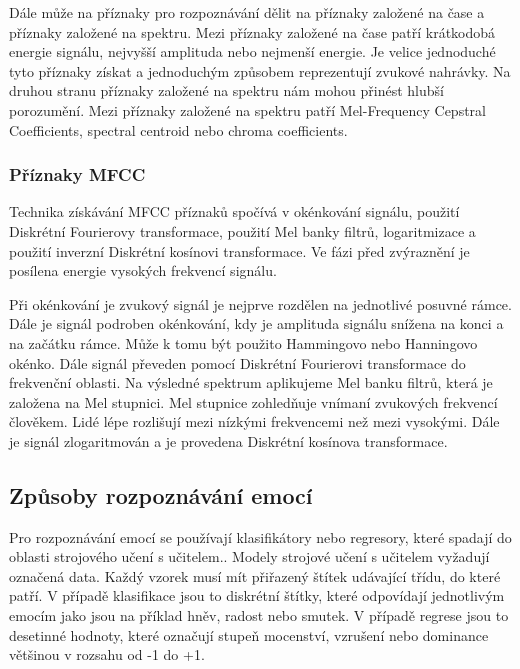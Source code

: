 \documentclass[FM,BP]{tulthesis}
\begin{document}
Dále může na příznaky pro rozpoznávání dělit na příznaky založené na čase a příznaky založené na spektru. Mezi příznaky založené na čase patří krátkodobá energie signálu, nejvyšší amplituda nebo nejmenší energie. Je velice jednoduché tyto příznaky získat a jednoduchým způsobem reprezentují zvukové nahrávky. Na druhou stranu příznaky založené na spektru nám mohou přinést hlubší porozumění. Mezi příznaky založené na spektru patří Mel-Frequency Cepstral Coefficients, spectral centroid nebo chroma coefficients\cite{DBLP:journals/corr/abs-1912-10458}.

\subsubsection{Příznaky MFCC}
Technika získávání MFCC příznaků spočívá v okénkování signálu, použití Diskrétní Fourierovy transformace, použití Mel banky filtrů, logaritmizace a použití inverzní Diskrétní kosínovi transformace. Ve fázi před zvýraznění je posílena energie vysokých frekvencí signálu. 

Při okénkování je zvukový signál je nejprve rozdělen na jednotlivé posuvné rámce. Dále je signál podroben okénkování, kdy je amplituda signálu snížena na konci a na začátku rámce. Může k tomu být použito Hammingovo nebo Hanningovo okénko. Dále signál převeden pomocí Diskrétní Fourierovi transformace do frekvenční oblasti. Na výsledné spektrum aplikujeme Mel banku filtrů, která je založena na Mel stupnici. Mel stupnice zohledňuje vnímaní zvukových frekvencí člověkem. Lidé lépe rozlišují mezi nízkými frekvencemi než mezi vysokými. Dále je signál zlogaritmován a je provedena Diskrétní kosínova transformace. \cite{hui_2019}

\subsection{Způsoby rozpoznávání emocí}
Pro rozpoznávání emocí se používají klasifikátory nebo regresory, které spadají do oblasti strojového učení s učitelem.\cite{DBLP:journals/speech/AkcayO20}. Modely strojové učení s učitelem vyžadují označená data. Každý vzorek musí mít přiřazený štítek udávající třídu, do které patří. V případě klasifikace jsou to diskrétní štítky, které odpovídají jednotlivým emocím jako jsou na příklad hněv, radost nebo smutek. V případě regrese jsou to desetinné hodnoty, které označují stupeň mocenství, vzrušení nebo dominance většinou v rozsahu od -1 do +1\cite{konar_chakraborty_2015}.
\end{document}
